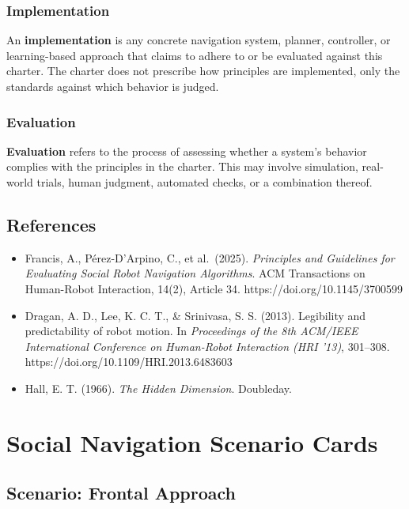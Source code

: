 \documentclass[utf8]{frontiers_suppmat} %
\providecommand{\tightlist}{%
  \setlength{\itemsep}{0pt}\setlength{\parskip}{0pt}}
\begin{document}
\subsubsection{Implementation}\label{implementation}

An \textbf{implementation} is any concrete navigation system, planner,
controller, or learning-based approach that claims to adhere to or be
evaluated against this charter. The charter does not prescribe how
principles are implemented, only the standards against which behavior is
judged.

\subsubsection{Evaluation}\label{evaluation}

\textbf{Evaluation} refers to the process of assessing whether a
system's behavior complies with the principles in the charter. This may
involve simulation, real-world trials, human judgment, automated checks,
or a combination thereof.

\subsection{References}\label{references}

\begin{itemize}
\tightlist
\item
  Francis, A., Pérez-D'Arpino, C., et al.~(2025). \emph{Principles and
  Guidelines for Evaluating Social Robot Navigation Algorithms}. ACM
  Transactions on Human-Robot Interaction, 14(2), Article 34.
  https://doi.org/10.1145/3700599
\item
  Dragan, A. D., Lee, K. C. T., \& Srinivasa, S. S. (2013). Legibility
  and predictability of robot motion. In \emph{Proceedings of the 8th
  ACM/IEEE International Conference on Human-Robot Interaction (HRI
  '13)}, 301--308. https://doi.org/10.1109/HRI.2013.6483603
\item
  Hall, E. T. (1966). \emph{The Hidden Dimension}. Doubleday.
\end{itemize}


\section{Social Navigation Scenario Cards}
\subsection{Scenario: Frontal Approach}\label{scenario-frontal-approach}
\end{document}
